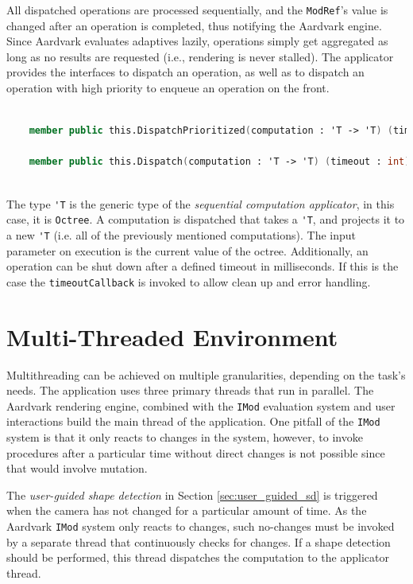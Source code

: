 All dispatched operations are processed sequentially, and the \verb|ModRef|'s value is changed after an operation is completed, thus notifying the Aardvark engine. Since Aardvark evaluates adaptives lazily, operations simply get aggregated as long as no results are requested (i.e., rendering is never stalled). 
The applicator provides the interfaces to dispatch an operation, as well as to dispatch an operation with high priority to enqueue an operation on the front. 

\begin{lstlisting}[language = FSharp]

    member public this.DispatchPrioritized(computation : 'T -> 'T) (timeout : int) (timeoutCallback  : unit -> unit) : unit = ...

    member public this.Dispatch(computation : 'T -> 'T) (timeout : int) (timeoutCallback  : unit -> unit) : unit = ...
   
\end{lstlisting}

The type \verb|'T| is the generic type of the \textit{sequential computation applicator}, in this case, it is \verb|Octree|. A computation is dispatched that takes a \verb|'T|, and projects it to a new \verb|'T| (i.e. all of the previously mentioned computations). The input parameter on execution is the current value of the octree. Additionally, an operation can be shut down after a defined timeout in milliseconds. If this is the case the \verb|timeoutCallback| is invoked to allow clean up and error handling. 


\section{Multi-Threaded Environment}
\label {sec:multithreading}

Multithreading can be achieved on multiple granularities, depending on the task's needs. The application uses three primary threads that run in parallel. The Aardvark rendering engine, combined with the \verb|IMod| evaluation system and user interactions build the main thread of the application. One pitfall of the \verb|IMod| system is that it only reacts to changes in the system, however, to invoke procedures after a particular time without direct changes is not possible since that would involve mutation.

\par

The \textit{user-guided shape detection} in Section \ref{sec:user_guided_sd} is triggered when the camera has not changed for a particular amount of time. As the Aardvark \verb|IMod| system only reacts to changes, such no-changes must be invoked by a separate thread that continuously checks for changes. If a shape detection should be performed, this thread dispatches the computation to the applicator thread.

